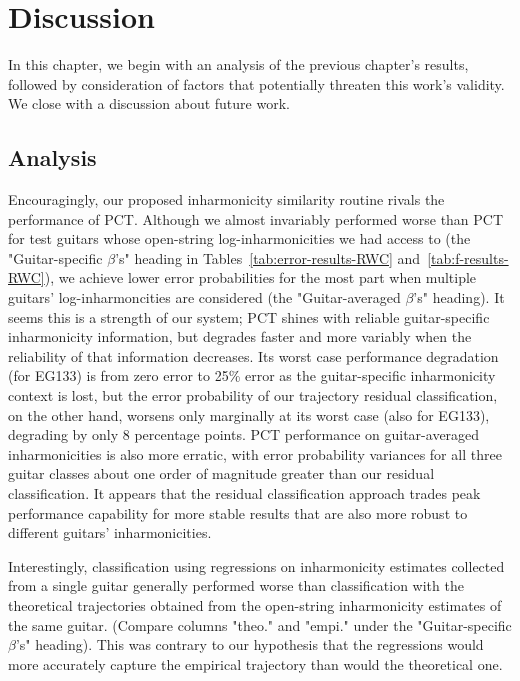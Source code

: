 \documentclass[12pt]{cmuthesis}
\begin{document}
\noindent
\chapter{Discussion}
\label{chap:discussion}
In this chapter, we begin with an analysis of the previous chapter's results, followed by consideration of factors that potentially threaten this work's validity. We close with a discussion about future work.

\section{Analysis}
Encouragingly, our proposed inharmonicity similarity routine rivals the performance of PCT. Although we almost invariably performed worse than PCT for test guitars whose open-string log-inharmonicities we had access to (the "Guitar-specific $\beta$'s" heading in Tables~\ref{tab:error-results-RWC} and~\ref{tab:f-results-RWC}), we achieve lower error probabilities for the most part when multiple guitars' log-inharmoncities are considered (the "Guitar-averaged $\beta$'s" heading). It seems this is a strength of our system; PCT shines with reliable guitar-specific inharmonicity information, but degrades faster and more variably when the reliability of that information decreases. Its worst case performance degradation (for EG133) is from zero error to 25\% error as the guitar-specific inharmonicity context is lost, but the error probability of our trajectory residual classification, on the other hand, worsens only marginally at its worst case (also for EG133), degrading by only 8 percentage points. PCT performance on guitar-averaged inharmonicities is also more erratic, with error probability variances for all three guitar classes about one order of magnitude greater than our residual classification. It appears that the residual classification approach trades peak performance capability for more stable results that are also more robust to different guitars' inharmonicities.


Interestingly, classification using regressions on inharmonicity estimates collected from a single guitar generally performed worse than classification with the theoretical trajectories obtained from the open-string inharmonicity estimates of the same guitar. (Compare columns "theo." and "empi." under the "Guitar-specific $\beta$'s" heading). This was contrary to our hypothesis that the regressions would more accurately capture the empirical trajectory than would the theoretical one.
\end{document}
